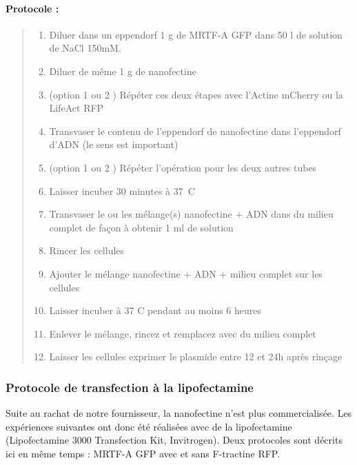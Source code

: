 \paragraph{Protocole : }
\begin{quote}
\begin{enumerate}
	\item Diluer dans un eppendorf 1 \micro g de MRTF-A GFP dans 50 \micro l de solution de NaCl 150mM. 
	\item Diluer de même 1 \micro g de nanofectine
	\item (option 1 ou 2 ) Répéter ces deux étapes avec l'Actine mCherry ou la LifeAct RFP
	\item Transvaser le contenu de l'eppendorf de nanofectine dans l'eppendorf d'ADN (le sens est important)
	\item (option 1 ou 2 ) Répéter l'opération pour les deux autres tubes
	\item Laisser incuber 30 minutes à 37~\degres C 
	\item Transvaser le ou les mélange(s) nanofectine + ADN dans du milieu complet de façon à obtenir 1  ml de solution
	\item Rincer les cellules
	\item Ajouter le mélange nanofectine + ADN + milieu complet sur les cellules
	\item Laisser incuber à 37 \degres C pendant au moins 6 heures
	\item Enlever le mélange, rincez et remplacez avec du milieu complet
	\item Laisser les cellules exprimer le plasmide entre 12 et 24h après rinçage
\end{enumerate}
\end{quote}

\subsubsection{Protocole de transfection à la lipofectamine}

Suite au rachat de notre fournisseur, la nanofectine n'est plus commercialisée. Les expériences suivantes ont donc été réalisées avec de la lipofectamine (Lipofectamine 3000 Transfection Kit, Invitrogen). Deux protocoles sont décrits ici en même temps : MRTF-A GFP avec et sans F-tractine RFP. 

